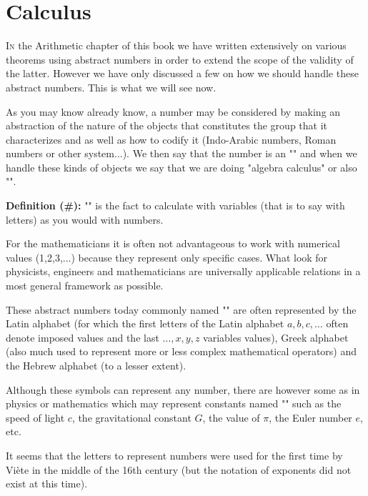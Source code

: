 	\newpage
	\thispagestyle{empty}
	\mbox{}
	\section{Calculus}\label{calculus}
	\lettrine[lines=4]{\color{BrickRed}I}n the Arithmetic chapter of this book we have written extensively on various theorems using abstract numbers in order to extend the scope of the validity of the latter. However we have only discussed a few on how we should handle these abstract numbers. This is what we will see now.
	
	As you may know already know, a number may be considered by making an abstraction of the nature of the objects that constitutes the group that it characterizes and as well as how to codify it (Indo-Arabic numbers, Roman numbers or other system...). We then say that the number is an "" and when we handle these kinds of objects we say that we are doing "algebra calculus" or also "".
	
	\textbf{Definition (\#\mydef):} "" is the fact to calculate with variables (that is to say with letters) as you would with numbers.
	
	For the mathematicians it is often not advantageous to work with numerical values (1,2,3,...) because they represent only specific cases. What look for physicists, engineers and mathematicians are universally applicable relations in a most general framework as possible.
	
	These abstract numbers today commonly named "" are often represented by the Latin alphabet (for which the first letters of the Latin alphabet $a, b, c, \ldots$ often denote imposed values and the last $\ldots, x, y, z$ variables values), Greek alphabet (also much used to represent more or less complex mathematical operators) and the Hebrew alphabet (to a lesser extent).
	
	Although these symbols can represent any number, there are however some as in  physics or mathematics which may represent constants named "" such as the speed of light $c$, the gravitational constant $G$, the value of $\pi$, the Euler number $e$, etc.

	\begin{tcolorbox}[title=Remark,colframe=black,arc=10pt]
	It seems that the letters to represent numbers were used for the first time by Viète in the middle of the 16th century (but the notation of exponents did not exist at this time).
	\end{tcolorbox}	

